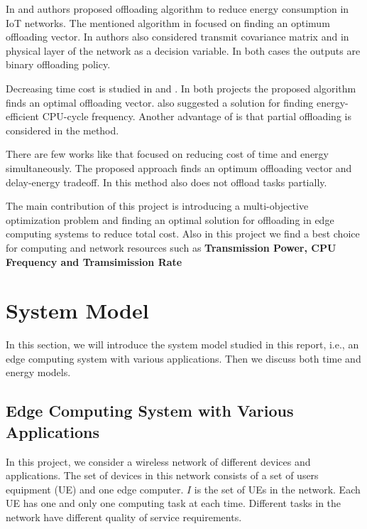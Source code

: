 \documentclass[12pt,final,3p]{CSP}
\begin{document}
In \cite{8742650} and \cite{7553459} authors proposed offloading algorithm to reduce energy consumption in IoT networks. The mentioned algorithm in \cite{7553459}  focused on finding an optimum offloading vector. In \cite{8742650} authors also considered transmit covariance matrix and in physical layer of the network as a decision variable. In both cases the outputs are binary offloading policy. 

Decreasing time cost is studied in \cite{8314696} and \cite{7130662}. In both projects the proposed algorithm finds an optimal offloading vector.  \cite{7130662} also suggested a solution for finding energy-efficient CPU-cycle frequency. Another advantage of  \cite{7130662} is that partial offloading is considered in the method. 

There are few works like \cite{8234686} that focused on reducing cost of time and energy simultaneously. The proposed approach finds an optimum offloading vector and delay-energy tradeoff. In this method also does not offload tasks partially. 

The main contribution of this project is introducing a multi-objective optimization problem and finding an optimal solution for  offloading in edge computing systems to reduce total cost. Also in this project we find a best choice for computing and network resources such as \textbf{Transmission Power, CPU Frequency and Tramsimission Rate}

\section{System Model}
\noindent
In this section, we will introduce the system model studied in this report, i.e., an edge computing system with various applications. Then we discuss both time and energy models. 
\subsection{Edge Computing System with Various Applications}
\noindent
In this project, we consider a wireless network of different devices and applications. The set of devices in this network consists of a set of users equipment (UE) and one edge computer. $I$ is the set of UEs in the network. Each UE has one and only one computing task at each time. Different tasks in the network have different quality of service requirements. 
\end{document}
